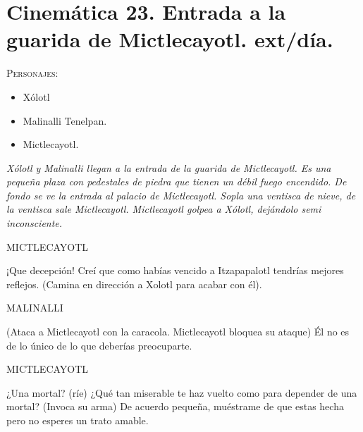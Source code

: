 \documentclass[11pt,letterpaper]{article}
\begin{document}
\section{Cinemática 23. Entrada a la guarida de Mictlecayotl. ext/día.}
 \textsc{Personajes}:
 \begin{itemize}
 \item Xólotl
 \item Malinalli Tenelpan.
 \item Mictlecayotl.
 \end{itemize}
\textit{Xólotl y Malinalli llegan a la entrada de la guarida de Mictlecayotl. Es una pequeña plaza con pedestales de piedra que tienen un débil fuego encendido. De fondo se ve la entrada al palacio de Mictlecayotl. Sopla una ventisca de nieve, de la ventisca sale Mictlecayotl. Mictlecayotl golpea a Xólotl, dejándolo semi inconsciente.}
\begin{center}
MICTLECAYOTL
\\
\par
¡Que decepción! Creí que como habías vencido a Itzapapalotl tendrías mejores reflejos. (Camina en dirección a Xolotl para acabar con él).
\\
\par
MALINALLI
\\
\par
(Ataca a Mictlecayotl con la caracola. Mictlecayotl bloquea su ataque) Él no es de lo único de lo que deberías preocuparte.
\\
\par
MICTLECAYOTL
\\
\par
¿Una mortal? (ríe) ¿Qué tan miserable te haz vuelto como para depender de una mortal? (Invoca su arma) De acuerdo pequeña, muéstrame de que estas hecha pero no esperes un trato amable.
\end{center}
\end{document}
